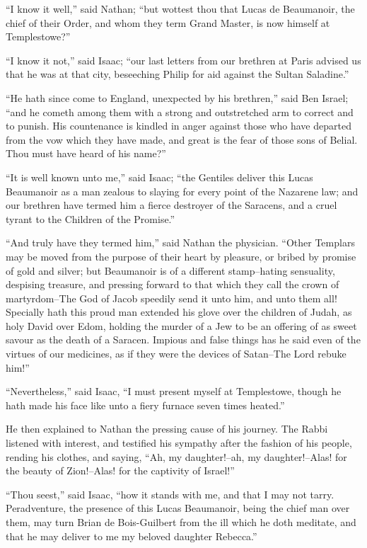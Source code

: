 ``I know it well,'' said Nathan; ``but wottest thou that Lucas de
Beaumanoir, the chief of their Order, and whom they term Grand Master,
is now himself at Templestowe?''

``I know it not,'' said Isaac; ``our last letters from our brethren at
Paris advised us that he was at that city, beseeching Philip for aid
against the Sultan Saladine.''

``He hath since come to England, unexpected by his brethren,'' said Ben
Israel; ``and he cometh among them with a strong and outstretched arm to
correct and to punish. His countenance is kindled in anger against those
who have departed from the vow which they have made, and great is the
fear of those sons of Belial. Thou must have heard of his name?''

``It is well known unto me,'' said Isaac; ``the Gentiles deliver this
Lucas Beaumanoir as a man zealous to slaying for every point of the
Nazarene law; and our brethren have termed him a fierce destroyer of the
Saracens, and a cruel tyrant to the Children of the Promise.''

``And truly have they termed him,'' said Nathan the physician. ``Other
Templars may be moved from the purpose of their heart by pleasure, or
bribed by promise of gold and silver; but Beaumanoir is of a different
stamp--hating sensuality, despising treasure, and pressing forward to
that which they call the crown of martyrdom--The God of Jacob speedily
send it unto him, and unto them all! Specially hath this proud man
extended his glove over the children of Judah, as holy David over Edom,
holding the murder of a Jew to be an offering of as sweet savour as the
death of a Saracen. Impious and false things has he said even of the
virtues of our medicines, as if they were the devices of Satan--The Lord
rebuke him!''

``Nevertheless,'' said Isaac, ``I must present myself at Templestowe,
though he hath made his face like unto a fiery furnace seven times
heated.''

He then explained to Nathan the pressing cause of his journey. The Rabbi
listened with interest, and testified his sympathy after the fashion of
his people, rending his clothes, and saying, ``Ah, my daughter!--ah, my
daughter!--Alas! for the beauty of Zion!--Alas! for the captivity of
Israel!''

``Thou seest,'' said Isaac, ``how it stands with me, and that I may not
tarry. Peradventure, the presence of this Lucas Beaumanoir, being the
chief man over them, may turn Brian de Bois-Guilbert from the ill which
he doth meditate, and that he may deliver to me my beloved daughter
Rebecca.''


